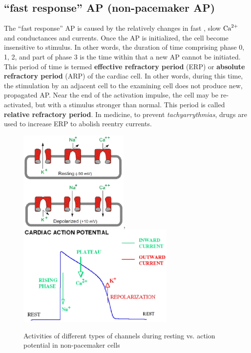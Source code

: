 \subsection{``fast response'' AP (non-pacemaker AP)}
\label{sec:fast-response-ap}

The ``fast response'' AP is caused by the relatively changes in fast
, slow ${\text{Ca}^{2+}}$ and  conductances and currents. Once
the AP is initialized, the cell become insensitive to stimulus. In
other words, the duration of time comprising phase 0, 1, 2, and part
of phase 3 is the time within that a new AP cannot be initiated. This
period of time is termed {\bf effective refractory period} (ERP) or
{\bf absolute refractory period} (ARP) of the cardiac cell. In other
words, during this time, the stimulation by an adjacent cell to the
examining cell does not produce new, propagated AP. Near the end of
the activation impulse, the cell may be re-activated, but with a
stimulus stronger than normal. This period is called
{\bf relative refractory period}.  In medicine, to prevent
{\it tachyarrythmias}, drugs are used to increase ERP to abolish
reentry currents.

\begin{figure}[hbt]
  \centerline{\includegraphics[height=5cm]{./images/channel_activation_AP.eps},
    \includegraphics[height=5cm]{./images/cardiac-current.eps}}
  \caption{Activities of different types of channels during resting
    vs. action potential in non-pacemaker cells}
  \label{fig:channel-activity}
\end{figure}

